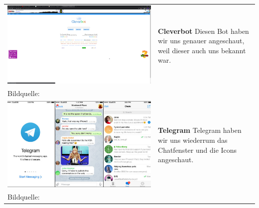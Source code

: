 \begin{tabular}{C{6cm}  L{7cm}}
    \includegraphics[width=\linewidth]{bilder/research pic/cleverbot.png}                 & \textbf{Cleverbot} \newline
    Diesen Bot haben wir uns genauer angeschaut, weil dieser auch uns bekannt war.                                      \\
    Bildquelle:\cite{cleverbot} \newline
    \\
    \includegraphics[width=\linewidth]{bilder/research pic/Telegram pic.png}              & \textbf{Telegram} \newline
    Telegram haben wir uns wiederrum das Chatfenster und die Icons angeschaut.                                          \\
    Bildquelle:\cite{telegrambild} \newline
    \\

\end{tabular}
